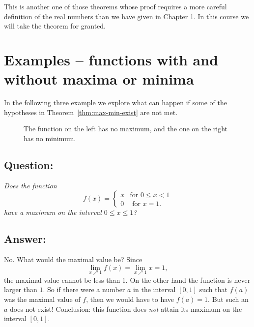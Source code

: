 This is another one of those theorems whose proof requires a more
careful definition of the real numbers than we have given in Chapter
1.  In this course we will take the theorem for granted.




\section{Examples -- functions with and without maxima or minima} %
In the following three example we explore what can happen if some of the
hypotheses in Theorem~\ref{thm:max-min-exist} are not met.




\begin{figure}[h]\centering
  \begin{minipage} {110pt}
    
  \end{minipage}
  \hfill
  \begin{minipage}{240pt}
    
  \end{minipage}
  \caption{The function on the left has no maximum, and the one on the right has
    no minimum.}\label{fig:05nomaxnomin}
\end{figure}
\subsection{Question: } %
\itshape Does the function
\[
f(x) =
\begin{cases}
  x & \text{for }0\leq x<1 \\ 0 &\text{ for }x=1.
\end{cases}
\]
have a maximum on the interval $0\leq x\leq 1$?\upshape




\subsection*{Answer: } %
No.  What would the maximal value be?  Since
\[
\lim_{x\nearrow1}f(x) = \lim_{x\nearrow1}x = 1,
\]
the maximal value cannot be less than 1.  On the other hand the function is
never larger than $1$.  So if there were a number $a$ in the interval $[0,1]$
such that $f(a)$ was the maximal value of $f$, then we would have to have $f(a) = 1$.
But such an $a$ does not exist!  Conclusion: this function does \emph{not}
attain its maximum on the interval $[0,1]$.




